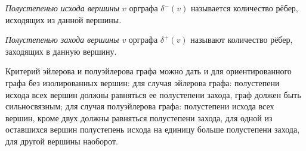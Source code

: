 \begin{definition}
    \textit{Полустепенью исхода вершины $v$} орграфа $\delta^-(v)$ называется количество
    рёбер, исходящих из данной вершины.
\end{definition}

\begin{definition}
    \textit{Полустепенью захода вершины $v$}
    орграфа $\delta^+(v)$ называют количество рёбер, заходящих в данную вершину.
\end{definition}

\newpage
Критерий эйлерова и полуэйлерова графа можно дать и для
ориентированного графа без изолированных вершин: для случая
эйлерова графа: полустепени исхода всех вершин должны равняться ее
полустепени захода, граф должен быть сильносвязным; для случая
полуэйлерова графа: полустепени исхода всех вершин, кроме двух
должны равняться полустепени захода, для одной из оставшихся вершин
полустепень исхода на единицу больше полустепени захода, для другой
вершины наоборот.
